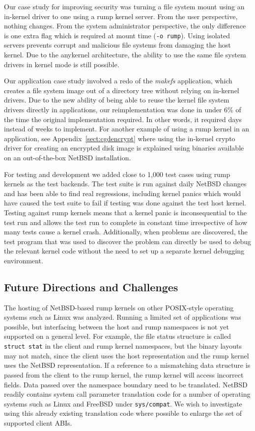 Our case study for improving security was turning a file system
mount using an in-kernel driver to one using a rump kernel server.
From the user perspective, nothing changes.  From the system
administrator perspective, the only difference is one extra flag
which is required at mount time (\texttt{-o rump}).  Using isolated
servers prevents corrupt and malicious file systems from damaging
the host kernel.  Due to the anykernel architecture, the ability
to use the same file system drivers in kernel mode is still possible.

Our application case study involved a redo of the \textit{makefs}
application, which creates a file system image out of a directory
tree without relying on in-kernel drivers.  Due to the new ability of
being able to reuse the kernel file system drivers directly in
applications, our reimplementation was done in under 6\% of the
time the original implementation required.  In other words, it
required days instead of weeks to implement.  For another example
of using a rump kernel in an application, see
Appendix~\ref{sect:cgdencrypt} where using the in-kernel crypto
driver for creating an encrypted disk image is explained
using binaries available on an out-of-the-box NetBSD installation.

For testing and development we added close to 1,000 test cases using rump
kernels as the test backends.  The test suite is run against daily NetBSD
changes and has been able to find real regressions, including kernel
panics which would have caused the test suite to fail if testing was done
against the test host kernel.  Testing against rump kernels means that a
kernel panic is inconsequential to the test run and allows the test run to
complete in constant time irrespective of how many tests cause a kernel
crash.  Additionally, when problems are discovered, the test program
that was used to discover the problem can directly be used to debug
the relevant kernel code without the need to set up a separate kernel
debugging environment.

\subsection{Future Directions and Challenges}
\label{chap:future}

The hosting of NetBSD-based rump kernels on other POSIX-style operating
systems such as Linux was analyzed.  Running a limited set of applications
was possible, but interfacing between the host and rump namespaces is not
yet supported on a general level.  For example, the file status structure
is called \texttt{struct~stat} in the client and rump kernel namespaces,
but the binary layouts may not match, since the client uses the host
representation and the rump kernel uses the NetBSD representation.
If a reference to a mismatching data structure is passed from the client
to the rump kernel, the rump kernel will access incorrect fields.
Data passed over the namespace boundary need to be translated.  NetBSD
readily contains system call parameter translation code for a number of
operating systems such as Linux and FreeBSD under \texttt{sys/compat}.
We wish to investigate using this already existing translation code
where possible to enlarge the set of supported client ABIs.

